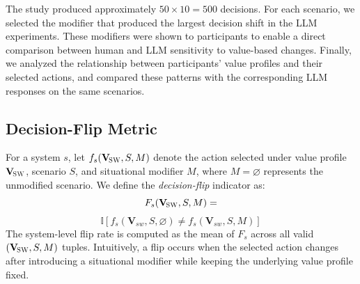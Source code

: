 \documentclass[11pt]{article}
\newcommand{\Vsw}{\mathbf{V}_{\!\textsc{SW}}}
\begin{document}
The study produced approximately $50 \times 10 = 500$ decisions. For each scenario, we selected the modifier that produced the largest decision shift in the LLM experiments. These modifiers were shown to participants to enable a direct comparison between human and LLM sensitivity to value-based changes. Finally, we analyzed the relationship between participants’ value profiles and their selected actions, and compared these patterns with the corresponding LLM responses on the same scenarios.





\subsection{Decision-Flip Metric}
\label{sec:flip-metric}

For a system $s$, let $f_s(\Vsw,S,M)$ denote the action selected under value profile $\Vsw$, scenario $S$, and situational modifier $M$, where $M=\varnothing$ represents the unmodified scenario. We define the \emph{decision-flip} indicator as:
\[
F_s(\Vsw,S,M) =
\]
\begin{equation}\label{eq:flip}
\mathbb{I}\!\left[
f_s(\mathbf{V}_{sw}, S, \varnothing)
\neq
f_s(\mathbf{V}_{sw}, S, M)
\right]
\end{equation}
The system-level flip rate is computed as the mean of $F_s$ across all valid $(\Vsw,S,M)$ tuples. Intuitively, a flip occurs when the selected action changes after introducing a situational modifier while keeping the underlying value profile fixed.
\end{document}
